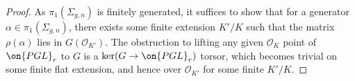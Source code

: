 \documentclass[12 pt]{amsart}
\theoremstyle{plain}
\theoremstyle{definition}
\theoremstyle{remark}
\numberwithin{equation}{section}
\begin{document}
\begin{proof}
As $\pi_1(\Sigma_{g,n})$ is finitely generated, it suffices to show that for a generator $\alpha\in \pi_1(\Sigma_{g,n})$, there exists some finite extension $K'/K$ such that the matrix $\rho(\alpha)$ lies in $G(\mathscr{O}_{K'})$. 
The obstruction to lifting any given $\mathscr O_K$ point of $\on{PGL}_r$ to
$G$ is a $\ker(G\to \on{PGL}_r)$ torsor, which becomes trivial on some finite
flat extension, and hence over $\mathscr O_{K'}$ for some finite $K'/K$.
%
%

\end{proof}
\end{document}
